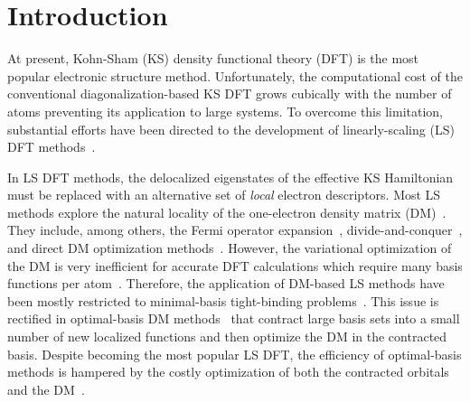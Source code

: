 \documentclass[aps,prl,twocolumn,reprint,amsmath,amssymb]{revtex4-1}
\begin{document}
\section{Introduction}

At present, Kohn-Sham (KS) density functional theory (DFT) is the most popular electronic structure method. 
Unfortunately, the computational cost of the conventional diagonalization-based KS DFT grows cubically with the number of atoms preventing its application to large systems. 
To overcome this limitation, substantial efforts have been directed to the development of linearly-scaling (LS) DFT methods~\cite{goedecker1999linear,bowler2012methods,zalesny2011linear}. 

In LS DFT methods, the delocalized eigenstates of the effective KS Hamiltonian must be replaced with an alternative set of \emph{local} electron descriptors. 
Most LS methods explore the natural locality of the one-electron density matrix (DM)~\cite{li1993density, lee1996linear, li2003density, shao2003curvy, vandevondele2012linear, kussmann2013linear, aarons2016perspective}.  
They include, among others, the Fermi operator expansion~\cite{goedecker1994efficient, goedecker1995tight}, divide-and-conquer~\cite{yang1991direct, yang1991local}, and direct DM optimization methods~\cite{li1993density, shao2003curvy, vandevondele2012linear}. 
However, the variational optimization of the DM is very inefficient for accurate DFT calculations which require many basis functions per atom~\cite{goedecker1999linear,vandevondele2012linear, arita2014stable, bowler2012methods, khaliullin2013efficient}.
Therefore, the application of DM-based LS methods have been mostly restricted to minimal-basis tight-binding problems~\cite{richters2014self, goringe1997tight, ratcliff2018band}. 
This issue is rectified in optimal-basis DM methods~\cite{skylaris2005introducing, nakata2015optimized, mohr2015accurate} that contract large basis sets into a small number of new localized functions and then optimize the DM in the contracted basis. 
Despite becoming the most popular LS DFT, the efficiency of optimal-basis methods is hampered by the costly optimization of both the contracted orbitals and the DM~\cite{mostofi2003preconditioned}.
\end{document}
